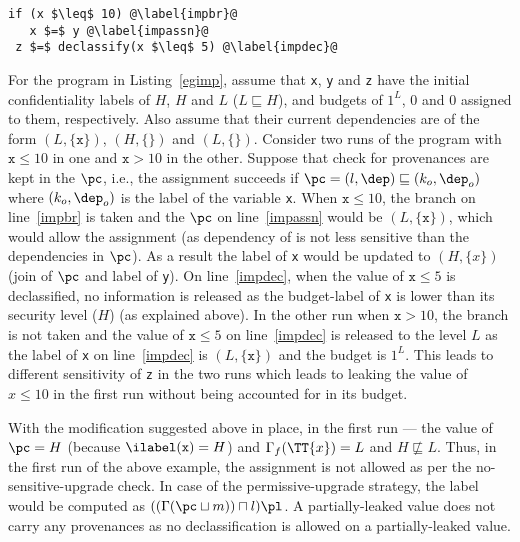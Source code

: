 \begin{lstlisting}[float,caption=Example illustrating handling of
  implicit flows,label=egimp]
 if (x $\leq$ 10) @\label{impbr}@
   x $=$ y @\label{impassn}@
 z $=$ declassify(x $\leq$ 5) @\label{impdec}@
\end{lstlisting}

For the program in Listing~\ref{egimp}, assume that \texttt{x}, \texttt{y} and
\texttt{z} have the initial confidentiality labels of $H$, $H$ and $L$ ($L
\sqsubseteq H$), and budgets of $1^L$, $0$ and $0$ assigned to them,
respectively. Also assume that their current dependencies are of the form $(L,
\{\texttt{x}\})$, $(H, \{\})$ and $(L, \{\})$. Consider two runs of the program
with $\texttt{x} \leq 10$ in one and $\texttt{x} > 10$ in the
other. Suppose that check for provenances are kept in the $\pc$, i.e.,
the assignment succeeds if $\pc = (l, \dep) \sqsubseteq (k_o, \dep_o)$
where $(k_o, \dep_o)$ is the label of the variable \texttt{x}.  When
$\texttt{x} \leq 10$, the branch  on line~\ref{impbr} is taken and the
$\pc$ on line~\ref{impassn} would be $(L, 
\{\texttt{x}\})$, which would allow the assignment (as dependency of
 is not less sensitive than the dependencies in $\pc$). As a
result the label of \texttt{x} would be updated to $(H, \{x\})$ (join
of $\pc$ and label of \texttt{y}). On line~\ref{impdec}, when the
value of $\texttt{x} \leq 5$ is declassified, no information is
released as the budget-label of \texttt{x} is lower than its security
level ($H$) (as explained above). In the other run when $\texttt{x}
> 10$, the branch is not taken and the value of $\texttt{x} \leq 5$ on
line~\ref{impdec} is released to the level $L$ as the label of
\texttt{x} on line~\ref{impdec} is $(L, \{\texttt{x}\})$ and 
the budget is $1^L$. This leads to different sensitivity of \texttt{z} in the
two runs which leads to leaking the value of $x \leq 10$ in the first
run without being accounted for in its budget.

With the modification suggested above in place, in the first run ---
the value of $\pc = H$ (because $\ilabel(\texttt{x}) = H$) and
$\Gamma_f(\TT{x}) = L$ and $H \not\sqsubseteq L$.  
Thus, in the first run of the above example, the assignment is not
allowed as per the no-sensitive-upgrade check. In case of the
permissive-upgrade strategy, the label would be computed as
$((\Gamma(\pc \sqcup m)) \sqcap l)\pl$. A partially-leaked value
does not carry any provenances as no declassification is allowed on a
partially-leaked value.


